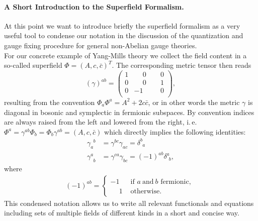 \paragraph{A Short Introduction to the Superfield Formalism.}

At this point we want to introduce briefly the superfield formalism \cite{QMeS2021, NPgaugeLecture} as a very useful tool to condense our notation in the discussion of the quantization and gauge fixing procedure for general non-Abelian gauge theories. \\
For our concrete example of Yang-Mills theory we collect the field content in a so-called superfield $\Phi = \left(A, c, \bar{c}\right)^T$. The corresponding metric tensor then reads
\begin{equation}
(\gamma)^{a b}=\left(\begin{array}{ccc}
1 & \phantom{-}0 & \phantom{-}0  \\
0 & \phantom{-}0 & \phantom{-}1  \\
0 & -1 & \phantom{-}0  \\
\end{array}\right),
\end{equation}
resulting from  the convention $\Phi_{a}\Phi^{a} = A^2 + 2c\bar{c}$, or in other words the metric $\gamma$ is diagonal in bosonic and symplectic in fermionic subspaces. By convention indices are always raised from the left and lowered from the right, i.\,e.  $\Phi^{a} = \gamma^{ab}\Phi_{b} = \Phi_{b}\gamma^{ab} = \left(A, c, \bar{c}\right)$ which directly implies the following identities:
\begin{align}
	\gamma_{a}^{\phantom{a}b} &= \gamma^{bc}\gamma_{ac} = \delta^{b}_{\phantom{c}a} \\
	\gamma^{a}_{\phantom{a}b} &= \gamma^{ca}\gamma_{bc} = (-1)^{ab}\delta^{a}_{\phantom{c}b},
\end{align}
where 
\begin{equation}
\begin{aligned}
	(-1)^{ab} = \left\{\begin{array}{ll}{-1} & {\text { if } a\ \text{and}\ b \text { fermionic, } } \\ {\phantom{-}1} & {\text { otherwise. }} 
	\end{array}\right.
\end{aligned}
\end{equation}
This condensed notation allows us to write all relevant functionals and equations including sets of multiple fields of different kinds  in a short and concise way.\\
